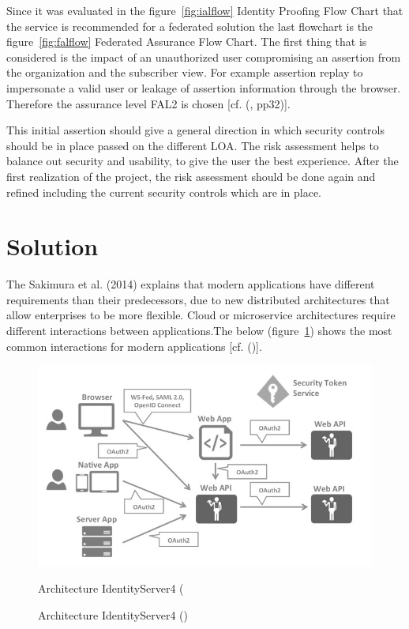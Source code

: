 Since it was evaluated in the figure~\ref{fig:ialflow} Identity Proofing Flow Chart that the service is recommended for a federated solution the last flowchart is the figure~\ref{fig:falflow} Federated Assurance Flow Chart. The first thing that is considered is the impact of an unauthorized user compromising an assertion from the organization and the subscriber view. For example assertion replay to impersonate a valid user or leakage of assertion information through the browser. Therefore the assurance level FAL2 is chosen [cf. (\cite{NIST:2017:DIG}, pp32)]. 


This initial assertion should give a general direction in which security controls should be in place passed on the different LOA. The risk assessment helps to balance out security and usability, to give the user the best experience. After the first realization of the project, the risk assessment should be done again and refined including the current security controls which are in place.
 



\section{Solution}
The Sakimura et al. (2014) explains that modern applications have different requirements than their predecessors, due to new distributed architectures that allow enterprises to be more flexible. Cloud or microservice architectures require different interactions between applications.The below (figure~\ref{fig:architecture-identityserver}) shows the most common interactions for modern applications [cf. (\cite{Sakimura:2014:OpenIDConnect})].

\begin{figure}[h]
	\centering
	\includegraphics[width=0.9\linewidth]{images/architecture-identityserver}
	\caption[Architecture IdentityServer4]{Architecture IdentityServer4 (\cite{Brock:2018:ID4}}
	\caption{Architecture IdentityServer4 (\cite{Brock:2018:ID4})}
	\label{fig:architecture-identityserver}
\end{figure}



